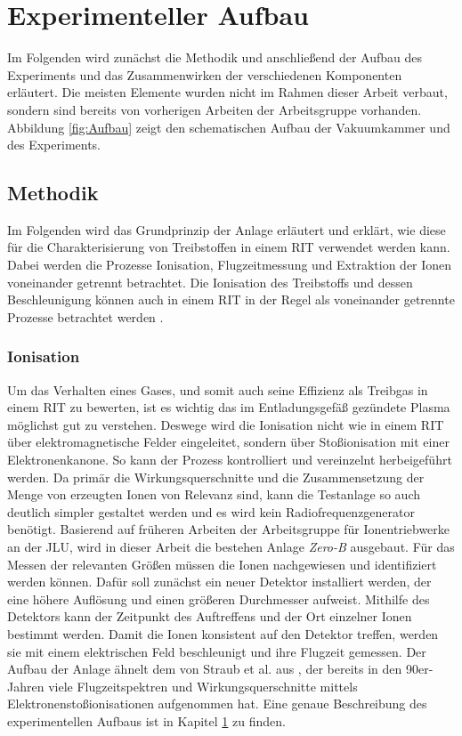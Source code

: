 \chapter{Experimenteller Aufbau}
\label{chap:Aufbau}
Im Folgenden wird zunächst die Methodik und anschließend der Aufbau des Experiments und das Zusammenwirken der verschiedenen Komponenten erläutert. Die meisten Elemente wurden nicht im Rahmen dieser Arbeit verbaut, sondern sind bereits von vorherigen Arbeiten der Arbeitsgruppe vorhanden. Abbildung \ref{fig:Aufbau} zeigt den schematischen Aufbau der Vakuumkammer und des Experiments.

\section{Methodik}
Im Folgenden wird das Grundprinzip der Anlage erläutert und erklärt, wie diese für die Charakterisierung von Treibstoffen in einem RIT verwendet werden kann. Dabei werden die Prozesse Ionisation, Flugzeitmessung und Extraktion der Ionen voneinander getrennt betrachtet. Die Ionisation des Treibstoffs und dessen Beschleunigung können auch in einem RIT in der Regel als voneinander getrennte Prozesse betrachtet werden \cite{ion}. 

\subsection{Ionisation} 
Um das Verhalten eines Gases, und somit auch seine Effizienz als Treibgas in einem RIT zu bewerten, ist es wichtig das im Entladungsgefäß gezündete Plasma möglichst gut zu verstehen. Deswege wird die Ionisation nicht wie in einem RIT über elektromagnetische Felder eingeleitet, sondern über Stoßionisation mit einer Elektronenkanone. So kann der Prozess kontrolliert und vereinzelnt herbeigeführt werden. Da primär die Wirkungsquerschnitte und die Zusammensetzung der Menge von erzeugten Ionen von Relevanz sind, kann die Testanlage so auch deutlich simpler gestaltet werden und es wird kein Radiofrequenzgenerator benötigt. Basierend auf früheren Arbeiten der Arbeitsgruppe für Ionentriebwerke an der JLU, wird in dieser Arbeit die bestehen Anlage \textit{Zero-B} ausgebaut. Für das Messen der relevanten Größen müssen die Ionen nachgewiesen und identifiziert werden können. Dafür soll zunächst ein neuer Detektor installiert werden, der eine höhere Auflösung und einen größeren Durchmesser aufweist. Mithilfe des Detektors kann der Zeitpunkt des Auftreffens und der Ort einzelner Ionen bestimmt werden. Damit die Ionen konsistent auf den Detektor treffen, werden sie mit einem elektrischen Feld beschleunigt und ihre Flugzeit gemessen. Der Aufbau der Anlage ähnelt dem von Straub et al. aus \cite{Straub}, der bereits in den 90er-Jahren viele Flugzeitspektren und Wirkungsquerschnitte mittels Elektronenstoßionisationen aufgenommen hat. Eine genaue Beschreibung des experimentellen Aufbaus ist in Kapitel \ref{chap:Aufbau} zu finden.

